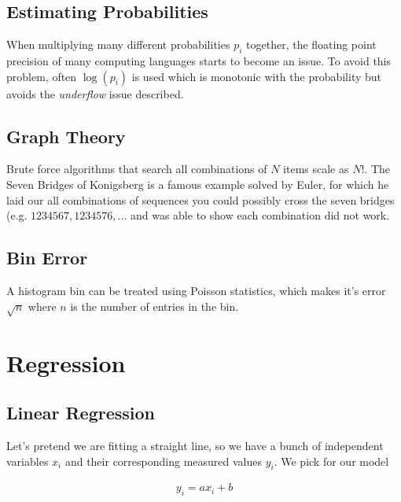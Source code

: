 \subsection{Estimating Probabilities}
When multiplying many different probabilities $p_i$ together, the floating point precision of many computing languages starts to become an issue. To avoid this problem, often $\log(p_i)$ is used which is monotonic with the probability but avoids the \textit{underflow} issue described.

\subsection{Graph Theory}
Brute force algorithms that search all combinations of $N$ items scale as $N!$. The Seven Bridges of Konigsberg is a famous example solved by Euler, for which he laid our all combinations of sequences you could possibly cross the seven bridges (e.g. $1234567, 1234576,...$ and was able to show each combination did not work.

\subsection{Bin Error}
A histogram bin can be treated using Poisson statistics, which makes it's error $\sqrt{n}$ where $n$ is the number of entries in the bin.

\section{Regression}
\subsection{Linear Regression}\label{least-squares}
Let's pretend we are fitting a straight line, so we have a bunch of independent variables $x_i$ and their corresponding measured values $y_i$. We pick for our model

\begin{align}
y_i = ax_i + b
\end{align}

